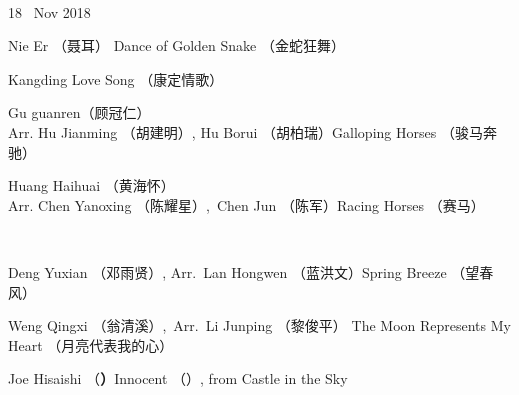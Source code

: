 \documentclass[letter,6pt,poets]{ConcProg}
\begin{document}
\begin{spacing}{1.0}
\begin{programme}{
\\  {\normalsize 18 ~Nov 2018}
}
\begin{part}[]
    \begin{composition}{Nie Er （聂耳）} {}{Dance of Golden Snake  （金蛇狂舞）}{}
    \end{composition}
    \begin{composition}{}{}{Kangding Love Song  （康定情歌）}{}
    \end{composition}
    \begin{composition}{Gu guanren（顾冠仁）\\ Arr. Hu Jianming （胡建明）, Hu Borui （胡柏瑞）}{}{Galloping Horses  （骏马奔驰）}{}
    \end{composition}
    \begin{composition}{Huang Haihuai （黄海怀）\\ Arr. Chen Yanoxing （陈耀星）,\  Chen Jun （陈军）}{}{Racing Horses  （赛马）}{}
    \end{composition}\\
    \begin{composition}{Deng Yuxian （邓雨贤）, Arr.\ Lan Hongwen （蓝洪文）}{}{Spring Breeze  （望春风）}{}
    \end{composition}
    \begin{composition}{Weng Qingxi （翁清溪）,\ Arr.\ Li Junping （黎俊平） }{}{The Moon Represents My Heart  （月亮代表我的心）}{}
    \end{composition}
    \begin{composition}{Joe Hisaishi （\textbf{）}}{}{Innocent （）, from Castle in the Sky }{}
                   {}{}
    \end{composition}
    
    



\end{part}
\end{programme}
\end{spacing}
\end{document}
